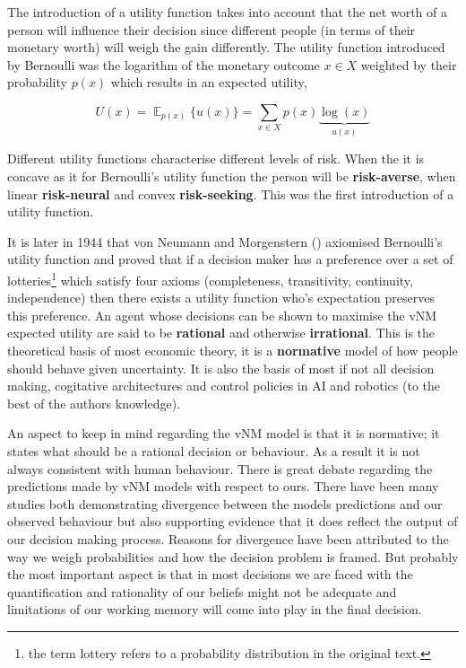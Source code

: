 The introduction of a utility function takes into account that the net worth of a person will influence their decision since 
different people (in terms of their monetary worth) will weigh the gain differently. The utility function introduced by Bernoulli 
was the logarithm of the monetary outcome $x \in X$ weighted by their probability $p(x)$ which results in an expected utility, 

\begin{equation*}\label{eq:exp_utility}
  U(x) = \displaystyle \mathop{\mathbb{E}}_{p(x)} \{ u(x) \} = \sum_{x\in X} p(x) \underbrace{\log(x)}_{u(x)}
\end{equation*}

Different utility functions characterise different levels of risk. When the it is concave as it for Bernoulli's utility function
the person will be \textbf{risk-averse}, when linear \textbf{risk-neural} and convex \textbf{risk-seeking}. 
This was the first introduction of a utility function.

It is later in 1944 that von Neumann and Morgenstern (\cite{VonNeumann1944}) axiomised Bernoulli's utility function 
and proved that if a decision maker has a preference over a set of lotteries\footnote{the term lottery refers 
to a probability distribution in the original text.} which satisfy four axioms
(completeness, transitivity, continuity, independence) then there exists a utility function who's expectation 
preserves this preference. An agent whose decisions can be shown to maximise the vNM expected utility are said 
to be \textbf{rational} and otherwise \textbf{irrational}.  This is the theoretical basis of most economic theory,
it is a \textbf{normative} model of how people should behave given uncertainty. It is also the basis of most 
if not all decision making, cogitative architectures and control policies in AI and robotics 
(to the best of the authors knowledge).

An aspect to keep in mind regarding the vNM model is that it is normative; it states what should be a rational decision 
or behaviour. As a result it is not always consistent with human behaviour. There is great debate regarding 
the predictions made by vNM models with respect to ours. There have been many studies both demonstrating divergence 
between the models predictions and our observed behaviour but also supporting evidence that it does reflect 
the output of our decision making process. Reasons for divergence have been attributed to the way we 
weigh probabilities and how the decision problem is framed. But probably the most important aspect is that 
in most decisions we are faced with the quantification and rationality of our beliefs might not be adequate
and limitations of our working memory will come into play in the final decision.

